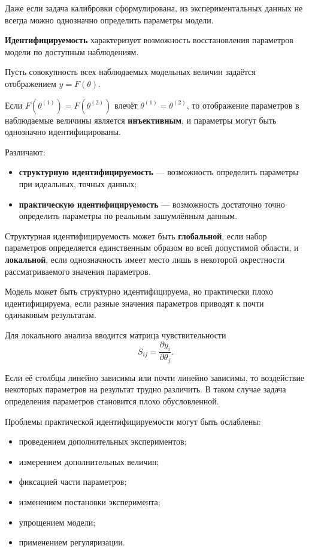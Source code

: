 Даже если задача калибровки сформулирована, из экспериментальных данных не всегда можно однозначно определить параметры модели.

\textbf{Идентифицируемость} характеризует возможность восстановления параметров модели по доступным наблюдениям.

Пусть совокупность всех наблюдаемых модельных величин задаётся отображением $y=F(\theta)$.

Если $F(\theta^{(1)})=F(\theta^{(2)})$ влечёт $\theta^{(1)}=\theta^{(2)}$, то отображение параметров в наблюдаемые величины является \textbf{инъективным}, и параметры могут быть однозначно идентифицированы.

Различают:
\begin{itemize}
	\item \textbf{структурную идентифицируемость} --- возможность определить параметры при идеальных, точных данных;
	\item \textbf{практическую идентифицируемость} --- возможность достаточно точно определить параметры по реальным зашумлённым данным.
\end{itemize}

Структурная идентифицируемость может быть \textbf{глобальной}, если набор параметров определяется единственным образом во всей допустимой области, и \textbf{локальной}, если однозначность имеет место лишь в некоторой окрестности рассматриваемого значения параметров.

Модель может быть структурно идентифицируема, но практически плохо идентифицируема, если разные значения параметров приводят к почти одинаковым результатам.

Для локального анализа вводится матрица чувствительности
\[
S_{ij}
=
\frac{\partial y_i}{\partial\theta_j}.
\]

Если её столбцы линейно зависимы или почти линейно зависимы, то воздействие некоторых параметров на результат трудно различить. В таком случае задача определения параметров становится плохо обусловленной.

Проблемы практической идентифицируемости могут быть ослаблены:
\begin{itemize}
	\item проведением дополнительных экспериментов;
	\item измерением дополнительных величин;
	\item фиксацией части параметров;
	\item изменением постановки эксперимента;
	\item упрощением модели;
	\item применением регуляризации.
\end{itemize}

